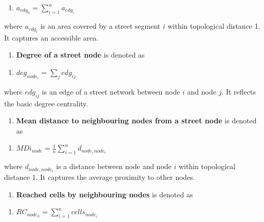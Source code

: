 \documentclass[
  letterpaper,
  DIV=11,
  numbers=noendperiod]{scrartcl}
\providecommand{\tightlist}{%
  \setlength{\itemsep}{0pt}\setlength{\parskip}{0pt}}\usepackage{longtable,booktabs,array}
\begin{document}
\begin{enumerate}
\def\labelenumi{(\arabic{enumi})}
\setcounter{enumi}{29}
\tightlist
\item
  \(a_{edg_n} = \sum_{i=1}^{n} a_{edg_i}\)
\end{enumerate}

where \(a_{edg_i}\) is an area covered by a street segment \(i\) within
topological distance 1. It captures an accessible area.

\begin{enumerate}
\def\labelenumi{\arabic{enumi}.}
\setcounter{enumi}{30}
\tightlist
\item
  \textbf{Degree of a street node} is denoted as
\end{enumerate}

\begin{enumerate}
\def\labelenumi{(\arabic{enumi})}
\setcounter{enumi}{30}
\tightlist
\item
  \(deg_{node_i} = \sum_{j} edg_{i j}\)
\end{enumerate}

where \(edg_{i j}\) is an edge of a street network between node \(i\)
and node \(j\). It reflects the basic degree centrality.

\begin{enumerate}
\def\labelenumi{\arabic{enumi}.}
\setcounter{enumi}{31}
\tightlist
\item
  \textbf{Mean distance to neighbouring nodes from a street node} is
  denoted as
\end{enumerate}

\begin{enumerate}
\def\labelenumi{(\arabic{enumi})}
\setcounter{enumi}{31}
\tightlist
\item
  \(MDi_{node} = \frac{1}{n} \sum_{i=1}^{n} d_{node, node_i}\)
\end{enumerate}

where \(d_{node, node_i}\) is a distance between node and node \(i\)
within topological distance 1. It captures the average proximity to
other nodes.

\begin{enumerate}
\def\labelenumi{\arabic{enumi}.}
\setcounter{enumi}{32}
\tightlist
\item
  \textbf{Reached cells by neighbouring nodes} is denoted as
\end{enumerate}

\begin{enumerate}
\def\labelenumi{(\arabic{enumi})}
\setcounter{enumi}{32}
\tightlist
\item
  \(RC_{node_n} = \sum_{i=1}^{n} cells_{node_i}\)
\end{enumerate}
\end{document}
